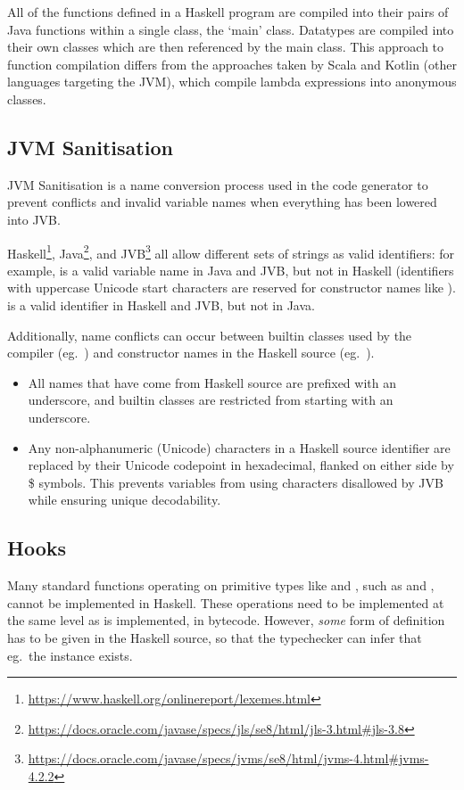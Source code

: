 \documentclass[dissertation.tex]{subfiles}
\begin{document}
{{{            All of the functions defined in a Haskell program are compiled into their pairs of Java functions within a single class, the `main' class. Datatypes are compiled into their own classes which are then referenced by the main class. This approach to function compilation differs from the approaches taken by Scala and Kotlin (other languages targeting the JVM), which compile lambda expressions into anonymous classes.
        }
    }
    \subsection{JVM Sanitisation}\label{sec:jvm-sanitisation}
    {
        JVM Sanitisation is a name conversion process used in the code generator to prevent conflicts and invalid variable names when everything has been lowered into JVB.

        Haskell\footnote{\url{https://www.haskell.org/onlinereport/lexemes.html}}, Java\footnote{\url{https://docs.oracle.com/javase/specs/jls/se8/html/jls-3.html\#jls-3.8}}, and JVB\footnote{\url{https://docs.oracle.com/javase/specs/jvms/se8/html/jvms-4.html\#jvms-4.2.2}} all allow different sets of strings as valid identifiers: for example,  is a valid variable name in Java and JVB, but not in Haskell (identifiers with uppercase Unicode start characters are reserved for constructor names like ). \monospace{(+)} is a valid identifier in Haskell and JVB, but not in Java.

        Additionally, name conflicts can occur between builtin classes used by the compiler (eg.\ ) and constructor names in the Haskell source (eg.\ ).

        \begin{itemize}
        \item
        {
            All names that have come from Haskell source are prefixed with an underscore, and builtin classes are restricted from starting with an underscore.
        }
        \item
        {
            Any non-alphanumeric (Unicode) characters in a Haskell source identifier are replaced by their Unicode codepoint in hexadecimal, flanked on either side by \$ symbols. This prevents variables from using characters disallowed by JVB while ensuring unique decodability.
        }
        \end{itemize}
    }
    \subsection{Hooks}\label{sec:hooks}
    {
        Many standard functions operating on primitive types like  and , such as \haskell{(+)} and \haskell{(==)}, cannot be implemented in Haskell. These operations need to be implemented at the same level as  is implemented, in bytecode. However, \textit{some} form of definition has to be given in the Haskell source, so that the typechecker can infer that eg.\ the instance exists.

}}
\end{document}

